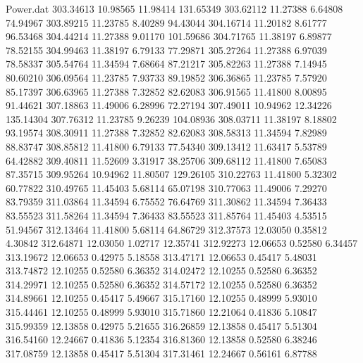 \begin{filecontents}{Power.dat}
 303.34613   10.98565   11.98414  131.65349
 303.62112   11.27388    6.64808   74.94967
 303.89215   11.23785    8.40289   94.43044
 304.16714   11.20182    8.61777   96.53468
 304.44214   11.27388    9.01170  101.59686
 304.71765   11.38197    6.89877   78.52155
 304.99463   11.38197    6.79133   77.29871
 305.27264   11.27388    6.97039   78.58337
 305.54764   11.34594    7.68664   87.21217
 305.82263   11.27388    7.14945   80.60210
 306.09564   11.23785    7.93733   89.19852
 306.36865   11.23785    7.57920   85.17397
 306.63965   11.27388    7.32852   82.62083
 306.91565   11.41800    8.00895   91.44621
 307.18863   11.49006    6.28996   72.27194
 307.49011   10.94962   12.34226  135.14304
 307.76312   11.23785    9.26239  104.08936
 308.03711   11.38197    8.18802   93.19574
 308.30911   11.27388    7.32852   82.62083
 308.58313   11.34594    7.82989   88.83747
 308.85812   11.41800    6.79133   77.54340
 309.13412   11.63417    5.53789   64.42882
 309.40811   11.52609    3.31917   38.25706
 309.68112   11.41800    7.65083   87.35715
 309.95264   10.94962   11.80507  129.26105
 310.22763   11.41800    5.32302   60.77822
 310.49765   11.45403    5.68114   65.07198
 310.77063   11.49006    7.29270   83.79359
 311.03864   11.34594    6.75552   76.64769
 311.30862   11.34594    7.36433   83.55523
 311.58264   11.34594    7.36433   83.55523
 311.85764   11.45403    4.53515   51.94567
 312.13464   11.41800    5.68114   64.86729
 312.37573   12.03050    0.35812    4.30842
 312.64871   12.03050    1.02717   12.35741
 312.92273   12.06653    0.52580    6.34457
 313.19672   12.06653    0.42975    5.18558
 313.47171   12.06653    0.45417    5.48031
 313.74872   12.10255    0.52580    6.36352
 314.02472   12.10255    0.52580    6.36352
 314.29971   12.10255    0.52580    6.36352
 314.57172   12.10255    0.52580    6.36352
 314.89661   12.10255    0.45417    5.49667
 315.17160   12.10255    0.48999    5.93010
 315.44461   12.10255    0.48999    5.93010
 315.71860   12.21064    0.41836    5.10847
 315.99359   12.13858    0.42975    5.21655
 316.26859   12.13858    0.45417    5.51304
 316.54160   12.24667    0.41836    5.12354
 316.81360   12.13858    0.52580    6.38246
 317.08759   12.13858    0.45417    5.51304
 317.31461   12.24667    0.56161    6.87788
\end{filecontents}
